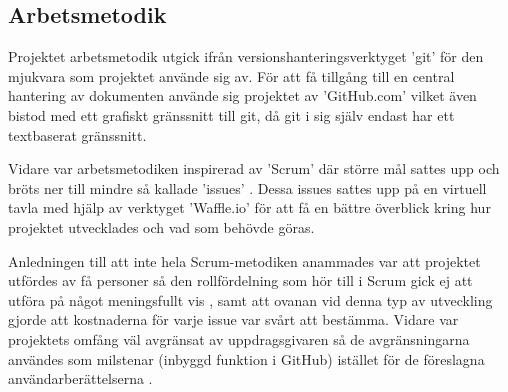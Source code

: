 
    \subsection{Arbetsmetodik} %
    \label{sub:arbetsmetodik}
        Projektet arbetsmetodik utgick ifrån versionshanteringsverktyget 'git' 
        för den mjukvara som projektet använde sig av. För att få tillgång 
        till en central hantering av dokumenten använde sig projektet av 'GitHub.com' vilket även bistod med ett grafiskt gränssnitt till git, då git i sig själv endast har ett textbaserat gränssnitt. \bigskip

        Vidare var arbetsmetodiken inspirerad av 'Scrum' där större mål sattes upp och bröts ner till mindre så kallade 'issues' \cite[kap.~8]{scrum}. Dessa issues sattes upp på en virtuell tavla med hjälp av verktyget 'Waffle.io' för att få en bättre överblick kring hur projektet utvecklades och vad som behövde göras. \bigskip

        Anledningen till att inte hela Scrum-metodiken anammades var att projektet utfördes av få personer så den rollfördelning som hör till i Scrum gick ej att utföra på något meningsfullt vis \cite[kap.~6]{scrum}, samt att ovanan vid denna typ av utveckling gjorde att kostnaderna för varje issue var svårt att bestämma. Vidare var projektets omfång väl avgränsat av uppdrags\-givaren så de avgränsningarna användes som milstenar (inbyggd funktion i GitHub) istället för de föreslagna användarberättelserna \cite[kap.~9]{scrum}. 


